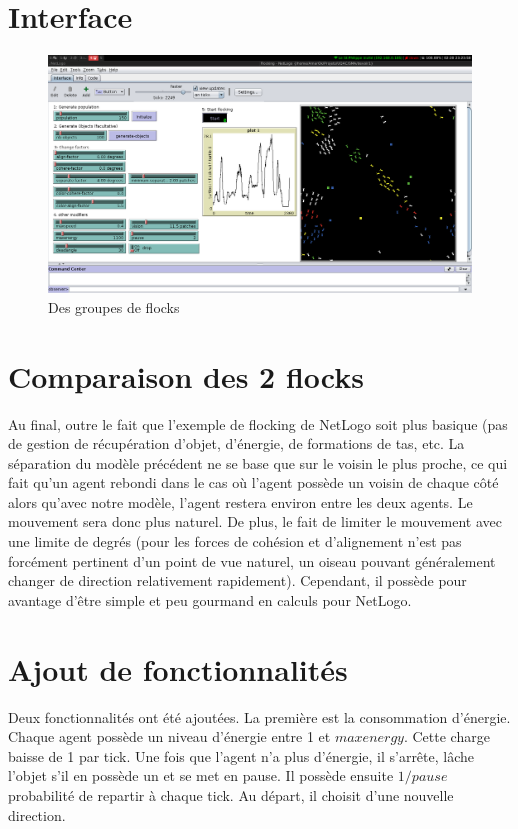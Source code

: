 \documentclass{article}
\begin{document}
\section{Interface}
\begin{figure}[h]
	\begin{center}
		\includegraphics[scale=0.3]{img/groups}
		\caption{Des groupes de flocks}
		\label{fig:groups}
	\end{center}
\end{figure}

\section{Comparaison des 2 flocks}
Au final, outre le fait que l'exemple de flocking de NetLogo soit plus basique (pas de gestion de récupération d'objet, d'énergie, de formations de tas, etc. La séparation du modèle précédent ne se base que sur le voisin le plus proche, ce qui fait qu'un agent rebondi dans le cas où l'agent possède un voisin de chaque côté alors qu'avec notre modèle, l'agent restera environ entre les deux agents. Le mouvement sera donc plus naturel.
De plus, le fait de limiter le mouvement avec une limite de degrés (pour les forces de cohésion et d'alignement n'est pas forcément pertinent d'un point de vue naturel, un oiseau pouvant généralement changer de direction relativement rapidement). Cependant, il possède pour avantage d'être simple et peu gourmand en calculs pour NetLogo.

\section{Ajout de fonctionnalités}

Deux fonctionnalités ont été ajoutées. La première est la consommation d'énergie. Chaque agent possède un niveau d'énergie entre 1 et $maxenergy$. Cette charge baisse de 1 par tick. Une fois que l'agent n'a plus d'énergie, il s'arrête, lâche l'objet s'il en possède un et se met en pause. Il possède ensuite $1/pause$ probabilité de repartir à chaque tick. Au départ, il choisit d'une nouvelle direction.
\end{document}

